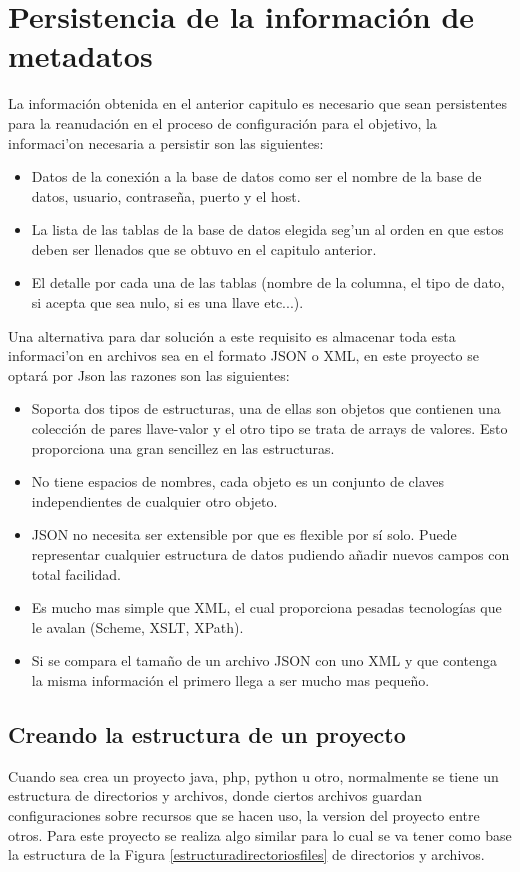 \section{Persistencia de la informaci\'on de metadatos}
La informaci\'on obtenida en el anterior capitulo es necesario que sean persistentes para la reanudaci\'on  en el proceso de configuraci\'on para el objetivo, la informaci'on necesaria a persistir son las siguientes:
\begin{itemize}
\item Datos de la conexi\'on a la base de datos como ser el nombre de la base de datos, usuario, contrase\~na, puerto y el host.
\item La lista de las tablas de la base de datos elegida seg'un al orden en que estos deben ser llenados que se obtuvo en el capitulo anterior.
\item El detalle por cada una de las tablas (nombre de la columna, el tipo de dato, si acepta que sea nulo, si es una llave etc...).  
\end{itemize}
Una alternativa para dar soluci\'on a este requisito es almacenar toda esta informaci'on en archivos sea en el formato JSON o XML, en este proyecto se optar\'a por Json las razones son las siguientes:

\begin{itemize}
\item Soporta dos tipos de estructuras, una de ellas son objetos que contienen una colecci\'on de pares llave-valor y el otro tipo se trata de arrays de valores. Esto proporciona una gran sencillez en las estructuras.
\item No tiene espacios de nombres, cada objeto es un conjunto de claves independientes de cualquier otro objeto.
\item JSON no necesita ser extensible por que es flexible por s\'i solo. Puede representar cualquier estructura de datos pudiendo a\~nadir nuevos campos con total facilidad.
\item Es mucho mas simple que XML, el cual proporciona pesadas tecnolog\'ias que le avalan (Scheme, XSLT, XPath).
\item Si se compara el tama\~no de un archivo JSON con uno XML y que contenga la misma informaci\'on el primero llega a ser mucho mas peque\~no.
\end{itemize} 
\subsection{Creando la estructura de un proyecto}
Cuando sea crea un proyecto java, php, python u otro, normalmente se tiene un estructura de directorios y archivos, donde ciertos archivos guardan configuraciones sobre recursos que se hacen uso, la version del proyecto entre otros. Para este proyecto se realiza algo similar para lo cual se va tener como base la estructura de la Figura \ref{estructuradirectoriosfiles} de directorios y archivos.

